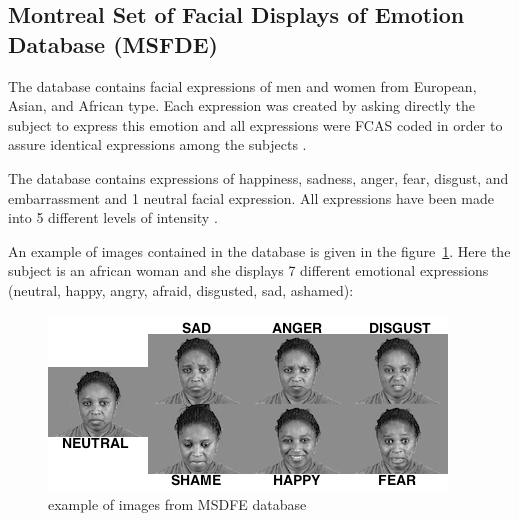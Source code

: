 \subsection{Montreal Set of Facial Displays of Emotion Database (MSFDE)}

\vspace{\baselineskip}
\noindent The database contains facial expressions of men and women from European, Asian, and African type. Each expression was created by asking directly the subject to express this emotion and all expressions were FCAS coded in order to assure identical expressions among the subjects \cite{MSFDE}.
\newline

\noindent The database contains expressions of happiness, sadness, anger, fear, disgust, and embarrassment and 1 neutral facial expression. All expressions have been made into 5 different levels of intensity \cite{MSFDE}.
\newline

\noindent An example of images contained in the database is given in the figure~\ref{msfde_7facialexpressions}. Here the subject is an african woman and she displays 7 different emotional expressions (neutral, happy, angry, afraid, disgusted, sad, ashamed): 
\newline

\begin{figure}[!h]
\begin{center}
\noindent \includegraphics[scale=0.9]{figures/msfde_7facialexpressions} 
\newline
\caption{example of images from MSDFE database}
\label{msfde_7facialexpressions}
\end{center} 
\end{figure}






